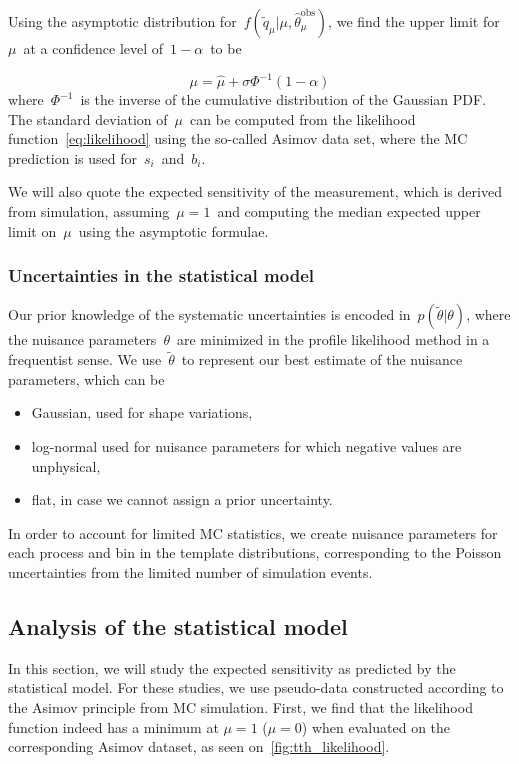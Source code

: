 Using the asymptotic distribution for~$f(\tilde{q}_\mu | \mu, \hat{\theta}_\mu^{\mathrm{obs}})$, we find the upper limit for~$\mu$~at a confidence level of~$1 - \alpha$~to be

\begin{equation}
\mu = \hat{\mu} + \sigma \Phi^{-1}(1 - \alpha)
\end{equation}
where~$\Phi^{-1}$~is the inverse of the cumulative distribution of the Gaussian PDF. The standard deviation of~$\mu$~can be computed from the likelihood function~\cref{eq:likelihood} using the so-called Asimov data set, where the MC prediction is used for~$s_i$~and~$b_i$.

We will also quote the expected sensitivity of the measurement, which is derived from simulation, assuming~$\mu = 1$~and computing the median expected upper limit on~$\mu$~using the asymptotic formulae. 

\subsubsection{Uncertainties in the statistical model}

Our prior knowledge of the systematic uncertainties is encoded in~$p(\tilde{\theta} | \theta)$, where the nuisance parameters~$\theta$~are minimized in the profile likelihood method in a frequentist sense. We use~$\tilde{\theta}$~to represent our best estimate of the nuisance parameters, which can be
\begin{itemize}
\item Gaussian, used for shape variations,
\item log-normal used for nuisance parameters for which negative values are unphysical,
\item flat, in case we cannot assign a prior uncertainty.
\end{itemize}
In order to account for limited MC statistics, we create nuisance parameters for each process and bin in the template distributions, corresponding to the Poisson uncertainties from the limited number of simulation events.

\subsection{Analysis of the statistical model}
\label{sec:model_analysis}
In this section, we will study the expected sensitivity as predicted by the statistical model. For these studies, we use pseudo-data constructed according to the Asimov principle from MC simulation. First, we find that the likelihood function indeed has a minimum at $\mu=1$ ($\mu=0$) when evaluated on the corresponding Asimov dataset, as seen on~\cref{fig:tth_likelihood}.


